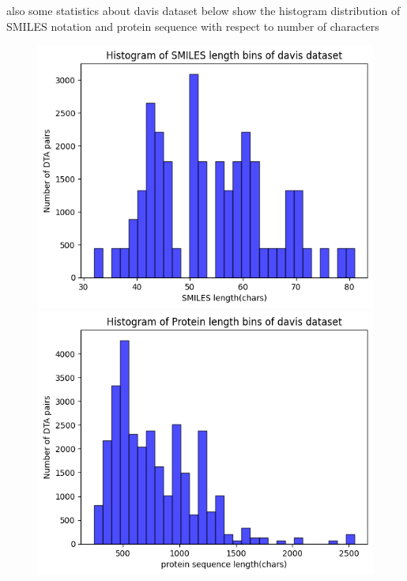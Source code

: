 \documentclass[11pt, a4paper]{article}
\begin{document}
            also some statistics about davis dataset below show the histogram distribution of SMILES notation and protein sequence with respect to number of characters 

            \begin{figure}[H]
                \centering
                \begin{minipage}{0.45\textwidth}
                \includegraphics[width=\textwidth]{davis/smiles histogram.png}
                \end{minipage}
                \hfill
                \begin{minipage}{0.45\textwidth}
                \includegraphics[width=\textwidth]{davis/protein histogram.png}
                \end{minipage}
            \end{figure}
\end{document}
